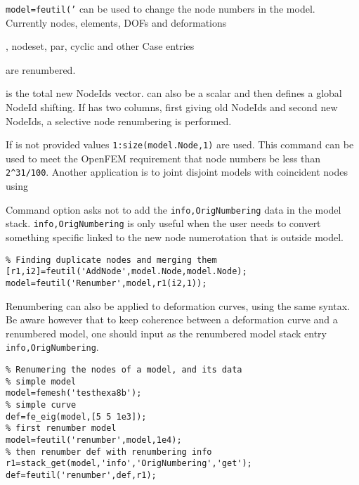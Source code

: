 
{\tt model=feutil('} can be used to change the node numbers in the model. Currently nodes, elements, DOFs and deformations \begin{SDT}, nodeset, par, cyclic and other Case entries \end{SDT} are renumbered.

 is the total new NodeIds vector.  can also be a scalar and then defines a global NodeId shifting. If  has two columns, first giving old NodeIds and second new NodeIds, a selective node renumbering is performed.

If  is not provided values {\tt 1:size(model.Node,1)} are used.  This command can be used to meet the OpenFEM requirement that node numbers be less than {\tt 2\verb+^+31/100}. Another application is to joint disjoint models with coincident nodes using

Command option  asks not to add the {\tt info,OrigNumbering} data in the model stack. {\tt info,OrigNumbering} is only useful when the user needs to convert something specific linked to the new node numerotation that is outside model.

\begin{verbatim}
% Finding duplicate nodes and merging them
[r1,i2]=feutil('AddNode',model.Node,model.Node);
model=feutil('Renumber',model,r1(i2,1));
\end{verbatim}

Renumbering can also be applied to deformation curves, using the same syntax. Be aware however that to keep coherence between a deformation curve and a renumbered model, one should input  as the renumbered model stack entry {\tt info,OrigNumbering}.

\begin{verbatim}
% Renumering the nodes of a model, and its data
% simple model
model=femesh('testhexa8b');
% simple curve
def=fe_eig(model,[5 5 1e3]);
% first renumber model
model=feutil('renumber',model,1e4);
% then renumber def with renumbering info
r1=stack_get(model,'info','OrigNumbering','get');
def=feutil('renumber',def,r1);
\end{verbatim}%


